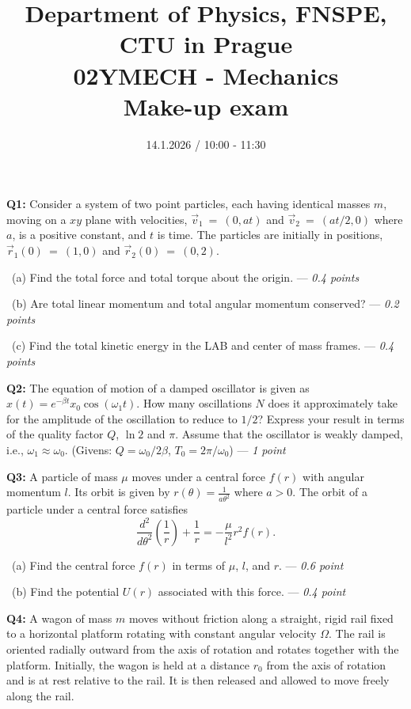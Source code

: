 \documentclass[a4paper,12pt]{article}
\title{{\large Department of Physics, FNSPE, CTU in Prague} \\
                  02YMECH - Mechanics \\ 
          {\Large \textbf{Make-up exam}}\vspace{-1cm}}
\date{14.1.2026 / 10:00 - 11:30}
\author{}
\begin{document}
\maketitle

\textbf{Q1:} Consider a system of two point particles, each having identical masses $m$, moving on a $xy$ plane with velocities, $\vec v_{1}~=~(0,at)$ and $\vec v_{2}~=~(at/2,0)$ where $a$, is a positive constant, and $t$ is time. The particles are initially in positions, $\vec r_{1}(0)~=~(1,0)$ and $\vec r_{2}(0)~=~(0,2)$.

\vspace*{0.1cm}
~(a) Find the total force and total torque about the origin. --- \textit{0.4 points}

~(b) Are total linear momentum and total angular momentum conserved? --- \textit{0.2 points}

~(c) Find the total kinetic energy in the LAB and center of mass frames. --- \textit{0.4 points}

\vspace*{0.25cm}
\textbf{Q2:} The equation of motion of a damped oscillator is given as $x(t)=e^{-\beta t}x_0\cos{\left(\omega_1 t\right)}$. How many oscillations $N$ does it approximately take for the amplitude of the oscillation to reduce to $1/2$? Express your result in terms of the quality factor $Q$, $\ln 2$ and $\pi$. Assume that the oscillator is weakly damped, i.e., $\omega_1 \approx \omega_0$.
(Givens: $Q = \omega_0/2\beta$, $T_0=2\pi/\omega_0$) --- \textit{1 point}

\vspace*{0.25cm}
\textbf{Q3:} A particle of mass $\mu$ moves under a central force $f(r)$ with angular momentum $l$. Its orbit is given by $r(\theta) = \frac{1}{a \theta^2}$ where $a > 0$. The orbit of a particle under a central force satisfies
\[
\frac{d^2}{d\theta^2}\left(\frac{1}{r}\right) + \frac{1}{r} = -\frac{\mu}{l^2} r^2 f(r).
\]

\vspace*{0.1cm}
~(a) Find the central force $f(r)$ in terms of $\mu$, $l$, and $r$. --- \textit{0.6 point}

~(b) Find the potential $U(r)$ associated with this force. --- \textit{0.4 point}

\vspace*{0.25cm}
\textbf{Q4:} A wagon of mass $m$ moves without friction along a straight, rigid rail fixed to a horizontal platform rotating with constant angular velocity $\Omega$.  
The rail is oriented radially outward from the axis of rotation and rotates together with the platform. Initially, the wagon is held at a distance $r_0$ from the axis of rotation and is at rest relative to the rail. It is then released and allowed to move freely along the rail.
\end{document}

